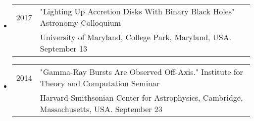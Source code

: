\begin{itemize}
\item \begin{tabular}{ll}
2017 & "Lighting Up Accretion Disks With Binary Black Holes" Astronomy Colloquium  \\
	& University of Maryland, College Park, Maryland, USA.  September 13
\end{tabular}

\item \begin{tabular}{ll}
2014 & "Gamma-Ray Bursts Are Observed Off-Axis." Institute for Theory and Computation Seminar  \\
	& Harvard-Smithsonian Center for Astrophysics, Cambridge, Massachusetts, USA.  September 23
\end{tabular}
\end{itemize}

